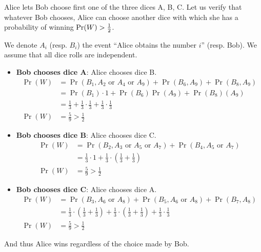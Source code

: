 
\newcommand{\f}[2]{\ensuremath{\frac{#1}{#2}}}

Alice lets Bob choose first one of the three dices A, B, C. Let us verify that whatever Bob chooses, Alice can choose another dice with which she has a probability of winning $\Pr(W) > {1 \over 2}$.

We denote $A_i$ (resp. $B_i$) the event ``Alice obtains the number $i$'' (resp. Bob). We assume that all dice rolls are independent.

\begin{itemize}
  \item \textbf{Bob chooses dice A}: Alice chooses dice B.\\
  \[
    \begin{array}{ll}
      \Pr(W) & = \Pr(B_1, {A_2\text{ or }A_4\text{ or }A_9}) + \Pr(B_6, A_9) + \Pr(B_8, A_9) \\
             & = \Pr(B_1) \cdot 1 + \Pr(B_6)\Pr(A_9) + \Pr(B_8)(A_9) \\
             & = \f{1}{3} + \f{1}{3} \cdot \f{1}{3} + \f{1}{3} \cdot \f{1}{3} \\
      \Pr(W) & = \f{5}{9} > \f{1}{2}
    \end{array}
  \]

  \item \textbf{Bob chooses dice B}: Alice chooses dice C.\\
  \[
    \begin{array}{ll}
      \Pr(W) & = \Pr(B_2, {A_3\text{ or }A_5\text{ or }A_7}) + \Pr(B_4, {A_5\text{ or }A_7}) \\
             & = \f{1}{3} \cdot 1 + \f{1}{3} \cdot (\f{1}{3} + \f{1}{3}) \\
      \Pr(W) & = \f{5}{9} > \f{1}{2}
    \end{array}
  \]

  \item \textbf{Bob chooses dice C}: Alice chooses dice A.\\
  \[
    \begin{array}{ll}
      \Pr(W) & = \Pr(B_3, {A_6\text{ or }A_8}) + \Pr(B_5, {A_6\text{ or }A_8}) + \Pr(B_7, A_8) \\
             & = \f{1}{3} \cdot (\f{1}{3} + \f{1}{3}) + \f{1}{3} \cdot (\f{1}{3} + \f{1}{3}) + \f{1}{3} \cdot \f{1}{3} \\
      \Pr(W) & = \f{5}{9} > \f{1}{2}
    \end{array}
  \]
\end{itemize}

And thus Alice wins regardless of the choice made by Bob.
